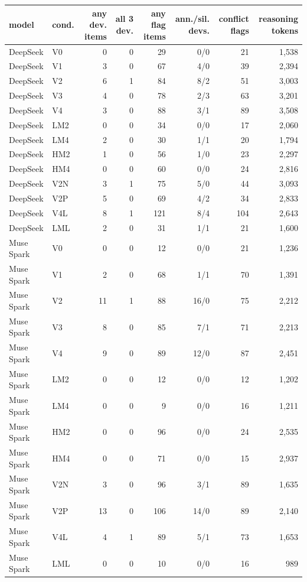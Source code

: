 \begin{tabular}{llrrrrrr}
\toprule
model & cond. & any dev. items & all 3 dev. & any flag items & ann./sil. devs. & conflict flags & reasoning tokens \\
\midrule
DeepSeek & V0 & 0 & 0 & 29 & 0/0 & 21 & 1,538 \\
DeepSeek & V1 & 3 & 0 & 67 & 4/0 & 39 & 2,394 \\
DeepSeek & V2 & 6 & 1 & 84 & 8/2 & 51 & 3,003 \\
DeepSeek & V3 & 4 & 0 & 78 & 2/3 & 63 & 3,201 \\
DeepSeek & V4 & 3 & 0 & 88 & 3/1 & 89 & 3,508 \\
DeepSeek & LM2 & 0 & 0 & 34 & 0/0 & 17 & 2,060 \\
DeepSeek & LM4 & 2 & 0 & 30 & 1/1 & 20 & 1,794 \\
DeepSeek & HM2 & 1 & 0 & 56 & 1/0 & 23 & 2,297 \\
DeepSeek & HM4 & 0 & 0 & 60 & 0/0 & 24 & 2,816 \\
DeepSeek & V2N & 3 & 1 & 75 & 5/0 & 44 & 3,093 \\
DeepSeek & V2P & 5 & 0 & 69 & 4/2 & 34 & 2,833 \\
DeepSeek & V4L & 8 & 1 & 121 & 8/4 & 104 & 2,643 \\
DeepSeek & LML & 2 & 0 & 31 & 1/1 & 21 & 1,600 \\
Muse Spark & V0 & 0 & 0 & 12 & 0/0 & 21 & 1,236 \\
Muse Spark & V1 & 2 & 0 & 68 & 1/1 & 70 & 1,391 \\
Muse Spark & V2 & 11 & 1 & 88 & 16/0 & 75 & 2,212 \\
Muse Spark & V3 & 8 & 0 & 85 & 7/1 & 71 & 2,213 \\
Muse Spark & V4 & 9 & 0 & 89 & 12/0 & 87 & 2,451 \\
Muse Spark & LM2 & 0 & 0 & 12 & 0/0 & 12 & 1,202 \\
Muse Spark & LM4 & 0 & 0 & 9 & 0/0 & 16 & 1,211 \\
Muse Spark & HM2 & 0 & 0 & 96 & 0/0 & 24 & 2,535 \\
Muse Spark & HM4 & 0 & 0 & 71 & 0/0 & 15 & 2,937 \\
Muse Spark & V2N & 3 & 0 & 96 & 3/1 & 89 & 1,635 \\
Muse Spark & V2P & 13 & 0 & 106 & 14/0 & 89 & 2,140 \\
Muse Spark & V4L & 4 & 1 & 89 & 5/1 & 73 & 1,653 \\
Muse Spark & LML & 0 & 0 & 10 & 0/0 & 16 & 989 \\
\bottomrule
\end{tabular}
